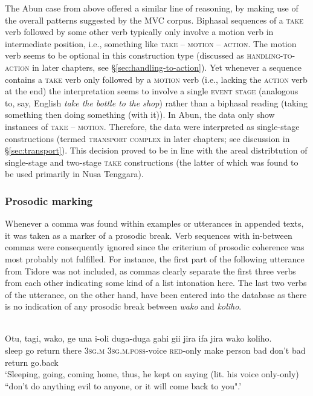 The Abun case from above offered a similar line of reasoning, by making use of the overall patterns suggested by the MVC corpus. Biphasal sequences of a \textsc{take} verb followed by some other verb typically only involve a motion verb in intermediate position, i.e., something like \textsc{take} -- \textsc{motion} -- \textsc{action}. The motion verb seems to be optional in this construction type (discussed as \textsc{handling-to-action} in later chapters, see §\ref{sec:handling-to-action}). Yet whenever a sequence contains a \textsc{take} verb only followed by a \textsc{motion} verb (i.e., lacking the \textsc{action} verb at the end) the interpretation seems to involve a single \textsc{event stage} (analogous to, say, English \textit{take the bottle to the shop}) rather than a biphasal reading (taking something then doing something (with it)). In Abun, the data only show instances of \textsc{take} -- \textsc{motion}. Therefore, the data were interpreted as single-stage constructions (termed \textsc{transport complex} in later chapters; see discussion in §\ref{sec:transport}). This decision proved to be in line with the areal distribtution of single-stage and two-stage \textsc{take} constructions (the latter of which was found to be used primarily in Nusa Tenggara). 

\subsubsection{Prosodic marking}

Whenever a comma was found within examples or utterances in appended texts, it was taken as a marker of a prosodic break. Verb sequences with in-between commas were consequently ignored since the criterium of prosodic coherence was most probably not fulfilled. For instance, the first part of the following utterance from Tidore was not included, as commas clearly separate the first three verbs from each other indicating some kind of a list intonation here. The last two verbs of the utterance, on the other hand, have been entered into the database as there is no indication of any prosodic break between \textit{wako} and \textit{koliho}.

\ea 
{}\\
\gll Otu, tagi, wako, ge una i-oli duga-duga gahi gii jira ifa jira wako koliho. \\
sleep go return there 3\textsc{sg}.\textsc{m} 3\textsc{sg}.\textsc{m}.\textsc{poss}-voice \textsc{red}-only make person bad don't bad return go.back \\
\glft `Sleeping, going, coming home, thus, he kept on saying (lit. his voice only-only) ``don’t
do anything evil to anyone, or it will come back to you".’\\ 
\z

